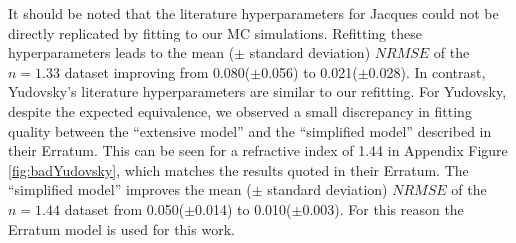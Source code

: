 It should be noted that the literature hyperparameters for Jacques could not be
directly
replicated by fitting to our MC simulations. 
Refitting these hyperparameters leads to the mean ($\pm$ standard deviation) $NRMSE$ of the $n=1.33$ dataset improving from 0.080($\pm$0.056) to 0.021($\pm$0.028). 
In contrast, Yudovsky's literature hyperparameters are similar to our refitting.
For Yudovsky, despite the expected equivalence, we observed a small discrepancy in fitting quality between the ``extensive model'' \cite{Yudovsky2009} and the ``simplified model'' described in their Erratum\cite{Yudovsky2015}.
This can be seen for a refractive index of 1.44 in Appendix Figure \ref{fig:badYudovsky}, which matches the results quoted in their Erratum\cite{Yudovsky2015}.
The ``simplified model'' improves the mean ($\pm$ standard deviation) $NRMSE$ of the $n=1.44$ dataset from 0.050($\pm$0.014) to 0.010($\pm$0.003).
For this reason the Erratum model is used for this work. 


